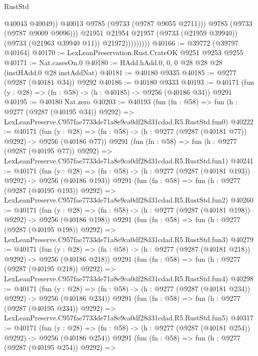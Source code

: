 \begin{lexlean}{RustStd}
\begin{coremodule}
                              @40043
                              @40049))
                          @40013
                          @9785
                          (@9733 (@9787 @9055 @2711)))
                        @9785
                        (@9733 (@9787 @9009 @9096)))
                      @21951
                      @21954
                      @21957
                      (@9733 (@21959 @39940))
                      (@9733 (@21963 @39940 @11))
                      @21972)))))))))
@40166 := @39772 (@39797 @40164)
@40170 := LexLeanPreservation.Rust.CrateOK @9251 @9253 @9255
@40171 := Nat.casesOn.{0}
@40180 := HAdd.hAdd.{0, 0, 0} @28 @28 @28 (instHAdd.{0} @28 instAddNat)
@40181 := @40180 @9335
@40185 := @9277 (@9287 (@40181 @34)) @9292
@40186 := @40180 @9333
@40193 := @40171 (fun (y : @28) => (fn : @58) -> (h : @40185) -> @9256 (@40186 @34)) @9291
@40195 := @40180 Nat.zero
@40203 := @40193
    (fun (fn : @58) =>
    fun (h : @9277 (@9287 (@40195 @34)) @9292) =>
    LexLeanPreserve.C957fae7733de71a8e9ca0df28d31cdad.R5.RustStd.fun0)
@40222 := @40171
    (fun (y : @28) => (fn : @58) -> (h : @9277 (@9287 (@40181 @77)) @9292) -> @9256 (@40186 @77))
    @9291
    (fun (fn : @58) =>
    fun (h : @9277 (@9287 (@40195 @77)) @9292) =>
    LexLeanPreserve.C957fae7733de71a8e9ca0df28d31cdad.R5.RustStd.fun1)
@40241 := @40171
    (fun (y : @28) => (fn : @58) -> (h : @9277 (@9287 (@40181 @193)) @9292) -> @9256 (@40186 @193))
    @9291
    (fun (fn : @58) =>
    fun (h : @9277 (@9287 (@40195 @193)) @9292) =>
    LexLeanPreserve.C957fae7733de71a8e9ca0df28d31cdad.R5.RustStd.fun2)
@40260 := @40171
    (fun (y : @28) => (fn : @58) -> (h : @9277 (@9287 (@40181 @198)) @9292) -> @9256 (@40186 @198))
    @9291
    (fun (fn : @58) =>
    fun (h : @9277 (@9287 (@40195 @198)) @9292) =>
    LexLeanPreserve.C957fae7733de71a8e9ca0df28d31cdad.R5.RustStd.fun3)
@40279 := @40171
    (fun (y : @28) => (fn : @58) -> (h : @9277 (@9287 (@40181 @218)) @9292) -> @9256 (@40186 @218))
    @9291
    (fun (fn : @58) =>
    fun (h : @9277 (@9287 (@40195 @218)) @9292) =>
    LexLeanPreserve.C957fae7733de71a8e9ca0df28d31cdad.R5.RustStd.fun4)
@40298 := @40171
    (fun (y : @28) => (fn : @58) -> (h : @9277 (@9287 (@40181 @234)) @9292) -> @9256 (@40186 @234))
    @9291
    (fun (fn : @58) =>
    fun (h : @9277 (@9287 (@40195 @234)) @9292) =>
    LexLeanPreserve.C957fae7733de71a8e9ca0df28d31cdad.R5.RustStd.fun5)
@40317 := @40171
    (fun (y : @28) => (fn : @58) -> (h : @9277 (@9287 (@40181 @254)) @9292) -> @9256 (@40186 @254))
    @9291
    (fun (fn : @58) =>
    fun (h : @9277 (@9287 (@40195 @254)) @9292) =>

\end{coremodule}
\end{lexlean}
